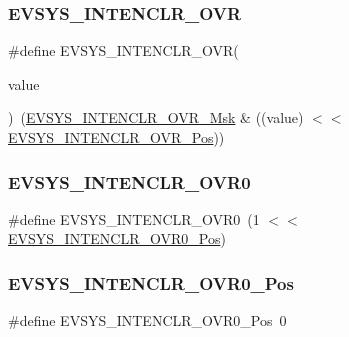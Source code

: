 \subsubsection{\texorpdfstring{EVSYS\_INTENCLR\_OVR}{EVSYS\_INTENCLR\_OVR}}
{\footnotesize\ttfamily \#define E\+V\+S\+Y\+S\+\_\+\+I\+N\+T\+E\+N\+C\+L\+R\+\_\+\+O\+VR(\begin{DoxyParamCaption}\item[{}]{value }\end{DoxyParamCaption})~(\mbox{\hyperlink{group___s_a_m_d21___e_v_s_y_s_ga8b07d636b3cc0fed1db4c969ca9eec79}{E\+V\+S\+Y\+S\+\_\+\+I\+N\+T\+E\+N\+C\+L\+R\+\_\+\+O\+V\+R\+\_\+\+Msk}} \& ((value) $<$$<$ \mbox{\hyperlink{group___s_a_m_d21___e_v_s_y_s_gafee2a545114cf715716165d6590ac9cc}{E\+V\+S\+Y\+S\+\_\+\+I\+N\+T\+E\+N\+C\+L\+R\+\_\+\+O\+V\+R\+\_\+\+Pos}}))}

\mbox{\label{group___s_a_m_d21___e_v_s_y_s_ga63b54e0793df11848d1ec5595e934b92}} 
\subsubsection{\texorpdfstring{EVSYS\_INTENCLR\_OVR0}{EVSYS\_INTENCLR\_OVR0}}
{\footnotesize\ttfamily \#define E\+V\+S\+Y\+S\+\_\+\+I\+N\+T\+E\+N\+C\+L\+R\+\_\+\+O\+V\+R0~(1 $<$$<$ \mbox{\hyperlink{group___s_a_m_d21___e_v_s_y_s_ga7be1d8ec8ebd796f7a965b29b44256b3}{E\+V\+S\+Y\+S\+\_\+\+I\+N\+T\+E\+N\+C\+L\+R\+\_\+\+O\+V\+R0\+\_\+\+Pos}})}

\mbox{\label{group___s_a_m_d21___e_v_s_y_s_ga7be1d8ec8ebd796f7a965b29b44256b3}} 
\subsubsection{\texorpdfstring{EVSYS\_INTENCLR\_OVR0\_Pos}{EVSYS\_INTENCLR\_OVR0\_Pos}}
{\footnotesize\ttfamily \#define E\+V\+S\+Y\+S\+\_\+\+I\+N\+T\+E\+N\+C\+L\+R\+\_\+\+O\+V\+R0\+\_\+\+Pos~0}



